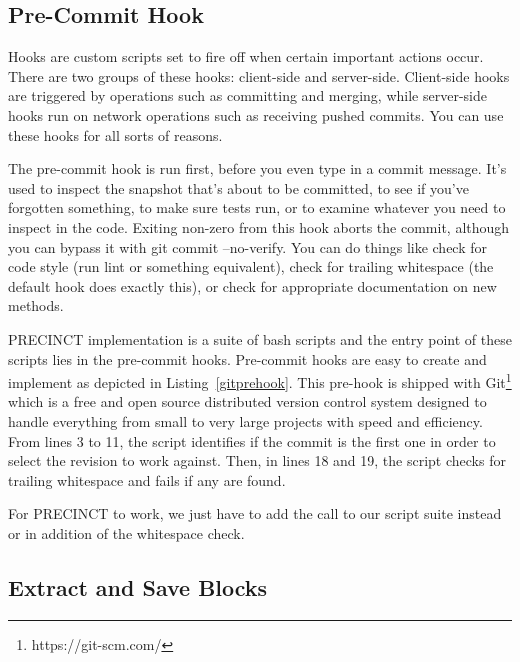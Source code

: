 \documentclass[conference]{IEEEtran}
\begin{document}
\subsection{Pre-Commit Hook}
\label{sub:Pre-Commit Hook}

Hooks are custom scripts set to fire off when certain important actions occur.
There are two groups of these hooks: client-side and server-side.
Client-side hooks are triggered by operations such as committing and merging, while server-side hooks run on network operations such as receiving pushed commits.
You can use these hooks for all sorts of reasons.

The pre-commit hook is run first, before you even type in a commit message.
It's used to inspect the snapshot that's about to be committed, to see if you've forgotten something, to make sure tests run, or to examine whatever you need to inspect in the code.
Exiting non-zero from this hook aborts the commit, although you can bypass it with git commit --no-verify.
You can do things like check for code style (run lint or something equivalent), check for trailing whitespace (the default hook does exactly this), or check for appropriate documentation on new methods.

PRECINCT implementation is a suite of bash scripts and the entry point of these scripts lies in the pre-commit hooks.
Pre-commit hooks are easy to create and implement as depicted in Listing~\ref{gitprehook}.
This pre-hook is shipped with Git\footnote{https://git-scm.com/} which is a free and open source distributed version control system designed to handle everything from small to very large projects with speed and efficiency.
From lines 3 to 11, the script identifies if the commit is the first one in order to select the revision to work against.
Then, in lines 18 and 19, the script checks for trailing whitespace and fails if any are found.

\noindent\begin{minipage}{0.90\linewidth}

  

\end{minipage}

For PRECINCT to work, we just have to add the call to our script suite instead or in addition of the whitespace check.

\subsection{Extract and Save Blocks}
\label{sub:Extract and Save Blocks}
\end{document}
